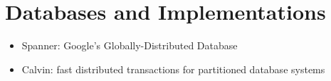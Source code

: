 \documentclass{article}
\begin{document}
\section{Databases and Implementations}

\begin{itemize}
	\item{Spanner: Google's Globally-Distributed Database \cite{Spanner}}

	\item{Calvin: fast distributed transactions for partitioned database systems \cite{Calvin}}
\end{itemize}



\end{document}
